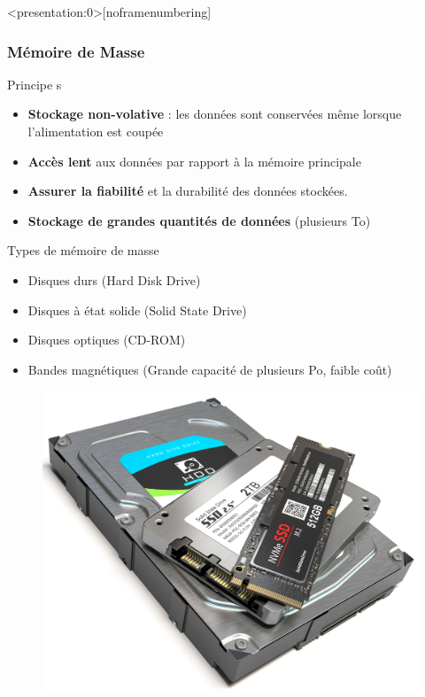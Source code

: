 \documentclass[8pt]{beamer}
\begin{document}
\begin{frame}<presentation:0>[noframenumbering]
    \frametitle{Mémoire de Masse}
    \begin{block}{Principe s}
        \begin{itemize}
            \item \textbf{Stockage non-volative} : les données sont conservées
                  même lorsque l'alimentation est coupée
            \item \textbf{Accès lent} aux données par rapport à la mémoire
                  principale
            \item \textbf{Assurer la fiabilité} et la durabilité des données
                  stockées.
            \item \textbf{Stockage de grandes quantités de données} (plusieurs
                  To)

        \end{itemize}
    \end{block}
    \begin{exampleblock}{Types de mémoire de masse}
        \begin{itemize}
            \item Disques durs (Hard Disk Drive)
            \item Disques à état solide (Solid State Drive)
            \item Disques optiques (CD-ROM)
            \item Bandes magnétiques (Grande capacité de plusieurs Po, faible
                  coût)
        \end{itemize}
    \end{exampleblock}
    \begin{figure}
        \centering
        \includegraphics[width=.25\textwidth]{figures/HDD+SSD.png}
    \end{figure}
\end{frame}
\end{document}
